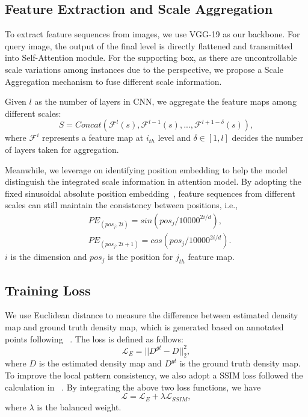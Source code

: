 \documentclass{article}
\begin{document}
\subsection{Feature Extraction and Scale Aggregation}

To extract feature sequences from images, we use VGG-19 as our backbone. For query image, the output of the final level is directly flattened and transmitted into Self-Attention module. For the supporting box, as there are uncontrollable scale variations among instances due to the perspective, we propose a Scale Aggregation mechanism to fuse different scale information.

Given $l$ as the number of layers in CNN, we aggregate the feature maps among different scales:
\begin{equation}
    S = Concat(\mathcal{F}^l(s), \mathcal{F}^{l-1}(s),...,\mathcal{F}^{l+1-\delta}(s)),
\end{equation}
where $\mathcal{F}^i$ represents a feature map at $i_{th}$ level and $\delta \in [1, l]$ decides the number of layers taken for aggregation.

Meanwhile, we leverage on identifying position embedding to help the model distinguish the integrated scale information in attention model. By adopting the fixed sinusoidal absolute position embedding~\cite{vaswani2017attention}, feature sequences from different scales can still maintain the consistency between positions, i.e., 
\begin{equation}
\begin{aligned}
    &PE_{(pos_j, 2i)} = sin(pos_j / 10000^{2i/d}),\\
    &PE_{(pos_j, 2i+1)} = cos(pos_j / 10000^{2i/d}).
\end{aligned}
\end{equation}
$i$ is the dimension and $pos_j$ is the position for $j_{th}$ feature map.


\subsection{Training Loss}

We use Euclidean distance to measure the difference between estimated density map and ground truth density map, which is generated based on annotated points following ~\cite{zhang2016single}. The loss is defined as follows:
\begin{equation}
    \mathcal{L}_E = ||D^{gt}-D||^2_2,
\end{equation}
where $D$ is the estimated density map and $D^{gt}$ is the ground truth density map. To improve the local pattern consistency, we also adopt a SSIM loss followed the calculation in ~\cite{cao2018scale}. By integrating the above two loss functions, we have
\begin{equation}
    \mathcal{L} = \mathcal{L}_E + \lambda \mathcal{L}_{SSIM},
\end{equation}
where $\lambda$ is the balanced weight.
\end{document}
